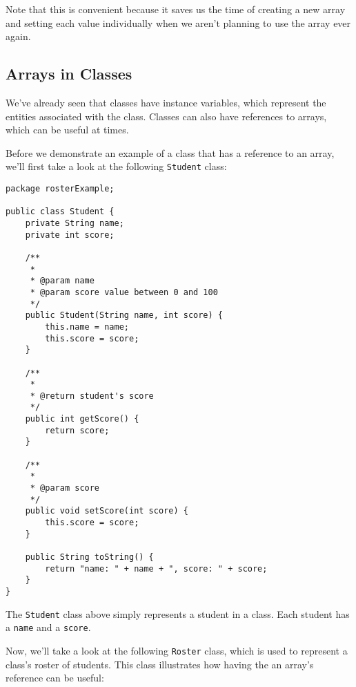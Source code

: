 Note that this is convenient because it saves us the time of creating a new array and setting each value individually when we aren't planning to use the array ever again.

\subsection{Arrays in Classes}

We've already seen that classes have instance variables, which represent the entities associated with the class. Classes can also have references to arrays, which can be useful at times.

Before we demonstrate an example of a class that has a reference to an array, we'll first take a look at the following \verb!Student! class:

\begin{lstlisting}
package rosterExample;

public class Student {
	private String name;
	private int score;
	
	/**
	 * 
	 * @param name
	 * @param score value between 0 and 100
	 */
	public Student(String name, int score) {
		this.name = name;
		this.score = score;
	}

	/**
	 * 
	 * @return student's score
	 */
	public int getScore() {
		return score;
	}

	/**
	 * 
	 * @param score
	 */
	public void setScore(int score) {
		this.score = score;
	}

	public String toString() {
		return "name: " + name + ", score: " + score;
	}
}
\end{lstlisting}

The \verb!Student! class above simply represents a student in a class. Each student has a \verb!name! and a \verb!score!. 

Now, we'll take a look at the following \verb!Roster! class, which is used to represent a class's roster of students. This class illustrates how having the an array's reference can be useful: 

